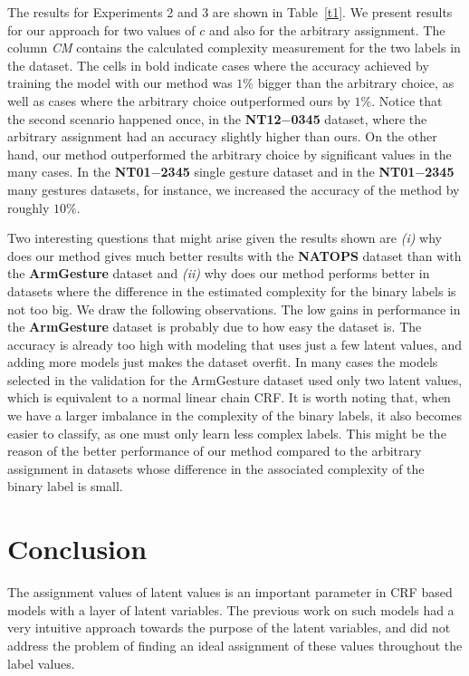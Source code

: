\documentclass[10pt, conference]{IEEEtran}
\begin{document}
The results for Experiments 2 and 3 are shown in Table~\ref{t1}. We present results for our approach for two values of $c$ and also for the arbitrary assignment. The column \textit{CM} contains the calculated complexity measurement for the two labels in the dataset.
The cells in bold indicate cases where the accuracy achieved by training the model with our method was $1\%$ bigger than the arbitrary choice, as well as cases where the arbitrary choice outperformed ours by $1\%$. 
Notice that the second scenario happened once, in the \textbf{NT12$-$0345} dataset, where the arbitrary assignment had an accuracy slightly higher than ours. 
On the other hand, our method outperformed the arbitrary choice by significant values in the many cases. In the \textbf{NT01$-$2345} single gesture dataset and in the \textbf{NT01$-$2345} many gestures datasets, for instance, we increased the accuracy of the method by roughly $10\%$.

Two interesting questions that might arise given the results shown are \textit{(i)} why does our method gives much better results with the \textbf{NATOPS} dataset than with the \textbf{ArmGesture} dataset and \textit{(ii)} why does our method performs better in datasets where the difference in the estimated complexity for the binary labels is not too big. 
We draw the following observations. The low gains in performance in the \textbf{ArmGesture} dataset is probably due to how easy the dataset is. The accuracy is already too high with modeling that uses just a few latent values, and adding more models just makes the dataset overfit. In many cases the models selected in the validation for the ArmGesture dataset used only two latent values, which is equivalent to a normal linear chain CRF.
It is worth noting that, when we have a larger imbalance in the complexity of the binary labels, it also becomes easier to classify, as one must only learn less complex labels. This might be the reason of the better performance of our method compared to the arbitrary assignment in datasets whose difference in the associated complexity of the binary label is small. 
\section{Conclusion}
The assignment values of latent values is an important parameter in CRF based models with a layer of latent variables.  The previous work on such models had a very intuitive approach towards the purpose of the latent variables, and did not address the problem of finding an ideal assignment of these values throughout the label values.
\end{document}
